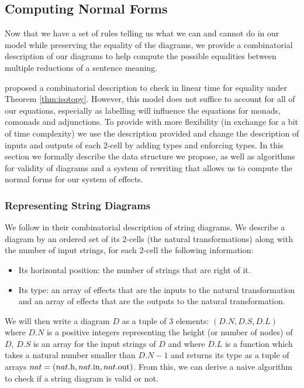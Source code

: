 \subsection{Computing Normal Forms}
Now that we have a set of rules telling us what we can and cannot do in our model while preserving the equality of the diagrams, we provide a combinatorial description of our diagrams to help compute the possible equalities between multiple reductions of a sentence meaning.

\cite{delpeuchNormalizationPlanarString2022} proposed a combinatorial description to check
in linear time for equality under Theorem \ref{thm:isotopy}.
However, this model does not suffice to account for all of our equations, especially as
labelling will influence the equations for monads, comonads and adjunctions.
To provide with more flexibility (in exchange for a bit of time complexity) we use the
description provided and change the description of inputs and outputs of each $2$-cell by
adding types and enforcing types.
In this section we formally describe the data structure we propose, as well as algorithms for
validity of diagrams and a system of rewriting that allows us to compute the normal forms
for our system of effects.

\subsubsection{Representing String Diagrams}
We follow \cite{delpeuchNormalizationPlanarString2022} in their combinatorial description
of string diagrams. We describe a diagram by an ordered set of its $2$-cells (the natural
transformations) along with the number of input strings, for each $2$-cell the following
information:
\begin{itemize}
	\item Its horizontal position: the number of strings that are right of it.
	\item Its type: an array of effects that are the inputs to the natural
	      transformation and an array of effects that are the outputs to the
	      natural transformation.
\end{itemize}
We will then write a diagram $D$ as a tuple of $3$ elements:
$\left( D.N, D.S, D.L \right)$ where $D.N$ is a positive integers representing the
height (or number of nodes) of $D$, $D.S$ is an array for the input strings of $D$ and
where $D.L$ is a function which takes a natural number smaller than $D.N - 1$ and
returns its type as a tuple of arrays
$nat = \left( nat\mathrm{.h}, nat\mathrm{.in}, nat\mathrm{.out} \right)$.
From this, we can derive a naive algorithm to check if a string diagram is
valid or not.

